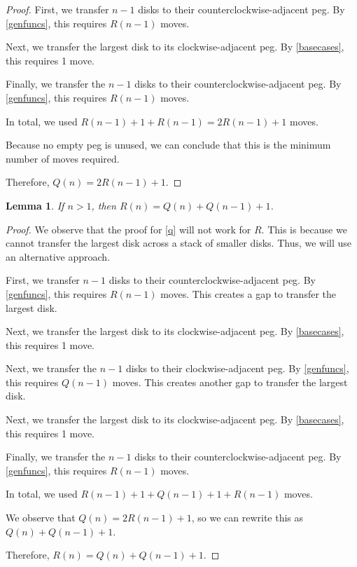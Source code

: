 \documentclass[12pt]{article}
\newtheorem{lemma}[theorem]{Lemma}
\theoremstyle{definition}
\begin{document}
\begin{proof}
  First, we transfer $n - 1$ disks to their
  counterclockwise-adjacent peg. By \cref{genfuncs}, this requires
  $R(n - 1)$ moves.

  Next, we transfer the largest disk to its clockwise-adjacent peg. By
  \cref{basecases}, this requires 1 move.

  Finally, we transfer the $n - 1$ disks to their
  counterclockwise-adjacent peg. By \cref{genfuncs}, this requires
  $R(n - 1)$ moves.

  In total, we used $R(n - 1) + 1 + R(n - 1) = 2R(n - 1) + 1$ moves.

  Because no empty peg is unused, we can conclude that this is the
  minimum number of moves required.

  Therefore, $Q(n) = 2R(n - 1) + 1$.
\end{proof}

\begin{lemma}
  \label{r}
  If $n > 1$, then $R(n) = Q(n) + Q(n - 1) + 1$.
\end{lemma}

\begin{proof}
  We observe that the proof for \cref{q} will not work for $R$.
  This is because we cannot transfer the largest disk across a stack
  of smaller disks. Thus, we will use an alternative approach.

  First, we transfer $n - 1$ disks to their
  counterclockwise-adjacent peg. By \cref{genfuncs}, this
  requires $R(n - 1)$ moves. This creates a gap to transfer the largest disk.

  Next, we transfer the largest disk to its clockwise-adjacent
  peg. By \cref{basecases}, this requires 1 move.

  Next, we transfer the $n - 1$ disks to their
  clockwise-adjacent peg. By \cref{genfuncs}, this requires
  $Q(n - 1)$ moves. This creates another gap to transfer the largest disk.

  Next, we transfer the largest disk to its clockwise-adjacent
  peg. By \cref{basecases}, this requires 1 move.

  Finally, we transfer the $n - 1$ disks to their
  counterclockwise-adjacent peg. By \cref{genfuncs}, this
  requires $R(n - 1)$ moves.

  In total, we used $R(n - 1) + 1 + Q(n - 1) + 1 + R(n - 1)$ moves.

  We observe that $Q(n) = 2R(n - 1) + 1$, so we can rewrite this as
  $Q(n) + Q(n - 1) + 1$.

  Therefore, $R(n) = Q(n) + Q(n - 1) + 1$.
\end{proof}
\end{document}
